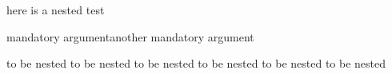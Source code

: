 here is a nested test
\begin{one}{mandatory argument}{another mandatory argument}




	to be nested to be nested
	to be nested to be nested
	to be nested to be nested
\end{one}
